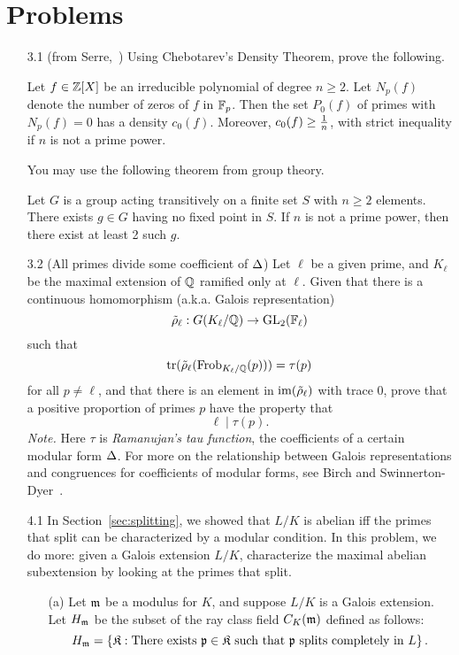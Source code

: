 \section{Problems}
\begin{enumerate}
\item[3.1] (from Serre,~\cite{Se03}) Using Chebotarev's Density Theorem, prove the following.
\begin{thm*}
Let $f\in \mathbb{Z}[X]$ be an irreducible polynomial of degree $n\ge 2$. Let $N_p(f)$ denote the number of zeros of $f$ in $\mathbb{F}_p$. Then the set $P_0(f)$ of primes with $N_p(f)=0$ has a density $c_0(f)$. Moreover, $c_0(f)\ge \frac{1}{n}$, with strict inequality if $n$ is not a prime power.
\end{thm*}
You may use the following theorem from group theory.
\begin{thm*}[Jordan]
Let $G$ is a group acting transitively on a finite set $S$ with $n\ge 2$ elements. There exists $g\in G$ having no fixed point in $S$. If $n$ is not a prime power, then there exist at least 2 such $g$.
\end{thm*}
\item[3.2] (All primes divide some coefficient of $\Delta$) Let $\ell$ be a given prime, and $K_{\ell}$ be the maximal extension of $\mathbb{Q}$ ramified only at $\ell$. 
Given that there is a continuous homomorphism (a.k.a. Galois representation)
\[
\tilde{\rho}_{\ell}:G(K_{\ell}/\mathbb{Q})\to \operatorname{GL}_2(\mathbb{F}_{\ell})
\]
such that
\[
\operatorname{tr}(\tilde{\rho}_{\ell}(\operatorname{Frob}_{K_{\ell}/\mathbb{Q}}(p)))=\tau(p)
\]
for all $p\neq\ell$, and that there is an element in $\text{im}(\tilde{\rho}_{\ell})$ with trace 0, 
prove that a positive proportion of primes $p$ have the property that
\[
\ell\mid \tau(p).
\]
{\it Note.} Here $\tau$ is {\it Ramanujan's tau function}, the coefficients of a certain modular form $\Delta$. For more on the relationship between Galois representations and congruences for coefficients of modular forms, see Birch and Swinnerton-Dyer~\cite{SD72}.
\item[4.1] In Section~\ref{sec:splitting}, we showed that $L/K$ is abelian iff the primes that split can be characterized by a modular condition. In this problem, we do more: given a Galois extension $L/K$, characterize the maximal abelian subextension by looking at the primes that split.
\begin{enumerate}
\item[(a)]
Let $\mathfrak{m}$ be a modulus for $K$, and suppose $L/K$ is a Galois extension. Let $H_{\mathfrak{m}}$ be the subset of the ray class field $C_K({\mathfrak{m}})$ 
defined as follows:
\[
H_{\mathfrak{m}}=\left\{{\mathfrak K}:{\text{There exists }\mathfrak{p}\in \mathfrak K\text{ such that }\mathfrak{p} \text{ splits completely in }L}\right\}.
\]
\end{enumerate}
\end{enumerate}
